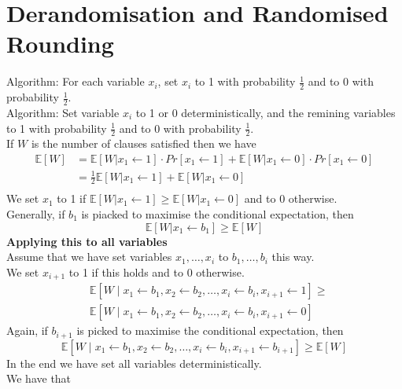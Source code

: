 \documentclass[onecolumn]{report}
\begin{document}
\section{Derandomisation and Randomised Rounding}
Algorithm: For each variable $x_i$, set $x_i$ to 1 with probability $\frac{1}{2}$ and to 0 with probability $\frac{1}{2}$.\\
Algorithm: Set variable $x_i$ to 1 or 0 deterministically, and the remining variables to 1 with probability $\frac{1}{2}$ and to 0 with probability $\frac{1}{2}$.\\
If $W$ is the number of clauses satisfied then we have
\begin{align*}
    \mathbb{E}[W] &= \mathbb{E}[W|x_1 \leftarrow 1]\cdot Pr[x_1 \leftarrow 1] + \mathbb{E}[W|x_1 \leftarrow 0]\cdot Pr[x_1 \leftarrow 0]\\
    &= \frac{1}{2}\mathbb{E}[W|x_1 \leftarrow 1] + \mathbb{E}[W|x_1 \leftarrow 0]\\
\end{align*}
We set $x_1$ to 1 if $\mathbb{E}[W|x_1 \leftarrow 1] \geq \mathbb{E}[W|x_1 \leftarrow 0]$ and to 0 otherwise.\\
Generally, if $b_1$ is piacked to maximise the conditional expectation, then
\begin{equation*}
    \mathbb{E}[W|x_1 \leftarrow b_1] \geq \mathbb{E}[W]
\end{equation*}
\textbf{Applying this to all variables}\\
Assume that we have set variables $x_1, \dots, x_i$ to $b_1, \dots, b_i$ this way.\\
We set $x_{i+1}$ to 1 if this holds and to 0 otherwise.\\
\begin{align*}
        & \mathbb{E}\left[W \mid x_1 \leftarrow b_1, x_2 \leftarrow b_2, \ldots, x_i \leftarrow b_i, x_{i+1} \leftarrow 1\right] \geq \\
        & \mathbb{E}\left[W \mid x_1 \leftarrow b_1, x_2 \leftarrow b_2, \ldots, x_i \leftarrow b_i, x_{i+1} \leftarrow 0\right]
\end{align*}
Again, if $b_{i+1}$ is picked to maximise the conditional expectation, then
\begin{equation*}
    \mathbb{E}[W \mid x_1 \leftarrow b_1, x_2 \leftarrow b_2, \ldots, x_i \leftarrow b_i, x_{i+1} \leftarrow b_{i+1}] \geq \mathbb{E}[W]
\end{equation*}
In the end we have set all variables deterministically.\\
We have that
\end{document}
